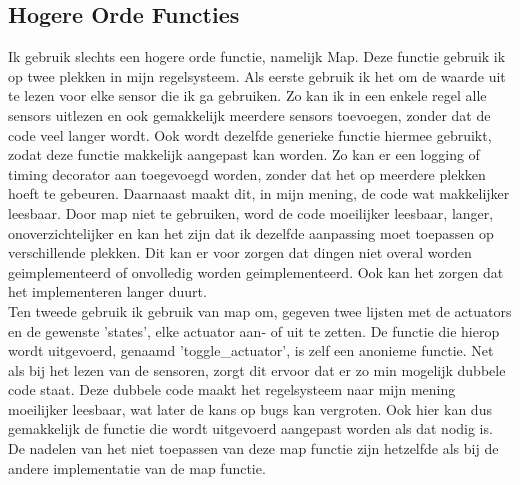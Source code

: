 \documentclass[a4paper]{report}
\begin{document}
\subsection{Hogere Orde Functies}
Ik gebruik slechts een hogere orde functie, namelijk Map.
Deze functie gebruik ik op twee plekken in mijn regelsysteem.
Als eerste gebruik ik het om de waarde uit te lezen voor elke sensor die ik ga gebruiken.
Zo kan ik in een enkele regel alle sensors uitlezen en ook gemakkelijk meerdere sensors toevoegen, zonder dat de code veel langer wordt.
Ook wordt dezelfde generieke functie hiermee gebruikt, zodat deze functie makkelijk aangepast kan worden. Zo kan er een logging of timing decorator aan toegevoegd worden, zonder dat het op meerdere plekken hoeft te gebeuren.
Daarnaast maakt dit, in mijn mening, de code wat makkelijker leesbaar.
Door map niet te gebruiken, word de code moeilijker leesbaar, langer, onoverzichtelijker en kan het zijn dat ik dezelfde aanpassing moet toepassen op verschillende plekken. 
Dit kan er voor zorgen dat dingen niet overal worden geimplementeerd of onvolledig worden geimplementeerd. Ook kan het zorgen dat het implementeren langer duurt.
\\
Ten tweede gebruik ik gebruik van map om, gegeven twee lijsten met de actuators en de gewenste 'states', elke actuator aan- of uit te zetten.
De functie die hierop wordt uitgevoerd, genaamd 'toggle\_actuator', is zelf een anonieme functie. 
Net als bij het lezen van de sensoren, zorgt dit ervoor dat er zo min mogelijk dubbele code staat. Deze dubbele code maakt het regelsysteem naar mijn mening moeilijker leesbaar, wat later de kans op bugs kan vergroten.
Ook hier kan dus gemakkelijk de functie die wordt uitgevoerd aangepast worden als dat nodig is.
De nadelen van het niet toepassen van deze map functie zijn hetzelfde als bij de andere implementatie van de map functie.
\end{document}
